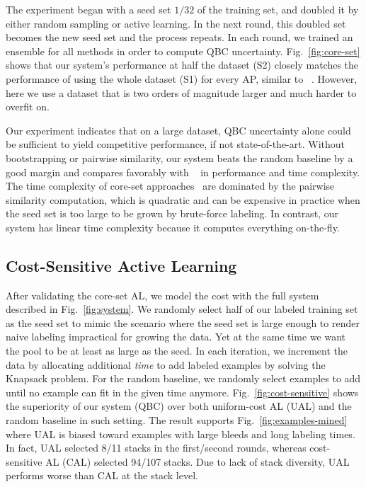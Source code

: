 \documentclass{llncs}
\begin{document}
The experiment began with a seed set $1/32$ of the training set, and doubled it by either random sampling or active learning. In the next round, this doubled set becomes the new seed set and the process repeats. In each round, we trained an ensemble for all methods in order to compute QBC uncertainty. Fig.~\ref{fig:core-set} shows that our system's performance at half the dataset (S2) closely matches the performance of using the whole dataset (S1) for every AP, similar to ~\cite{yang2017suggestive,sener2018active}. However, here we use a dataset that is two orders of magnitude larger and much harder to overfit on. 

Our experiment indicates that on a large dataset, QBC uncertainty alone could be sufficient to yield competitive performance, if not state-of-the-art. Without bootstrapping or pairwise similarity, our system beats the random baseline by a good margin and compares favorably with ~\cite{yang2017suggestive} in performance and time complexity. The time complexity of core-set approaches~\cite{yang2017suggestive,sener2018active} are dominated by the pairwise similarity computation, which is quadratic and can be expensive in practice when the seed set is too large to be grown by brute-force labeling. In contrast, our system has linear time complexity because it computes everything on-the-fly.


\subsection{Cost-Sensitive Active Learning}
\vspace*{-0.05cm}

After validating the core-set AL, we model the cost with the full system described in Fig.~\ref{fig:system}. We randomly select half of our labeled training set as the seed set to mimic the scenario where the seed set is large enough to render naive labeling impractical for growing the data. Yet at the same time we want the pool to be at least as large as the seed. In each iteration, we increment the data by allocating additional \textit{time} to add labeled examples by solving the Knapsack problem. For the random baseline, we randomly select examples to add until no example can fit in the given time anymore. Fig.~\ref{fig:cost-sensitive} shows the superiority of our system (QBC) over both uniform-cost AL (UAL) and the random baseline in such setting. The result supports Fig.~\ref{fig:examples-mined} where UAL is biased toward examples with large bleeds and long labeling times. In fact, UAL selected 8/11 stacks in the first/second rounds, whereas cost-sensitive AL (CAL) selected 94/107 stacks. Due to lack of stack diversity, UAL performs worse than CAL at the stack level. 
\end{document}
